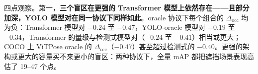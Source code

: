 \documentclass[10pt,conference]{IEEEtran}
\begin{document}
\begin{table}[t]
\centering
\caption{oracle 协议下的 M3 时序指标（PoseTrack18 val；保留轨迹段：ViTPose-B/L 为 868 / 885，round5-3-oracle / YOLO11s-oracle 为 709 / 651，覆盖 170 个视频）。匹配口径 AP：0.5248 / 0.5548（ViTPose-B/L），0.3301 / 0.3085（round5-3-oracle / YOLO11s-oracle；oracle 值，与表~\ref{tab:m3} 的检测式值不可比）。AP 代价 $=$ 平滑后匹配口径 AP $-$ 原始。YOLO-oracle 的平滑总结在正文（第~5.5 节）。$^{\dagger}$ 检测式运行（表~\ref{tab:m3}）；仅作桥梁。}
\label{tab:m3x}
\renewcommand{\arraystretch}{1.15}
\end{table}

四点观察。第一，\textbf{三个盲区在更强的 Transformer 模型上依然存在——且部分加深，YOLO 模型对在同一协议下同样如此}。oracle 协议下每个组合的 $\Delta_{\mathrm{occ}}$ 均为负：Transformer 模型对 $-0.24$ 至 $-0.47$，YOLO-oracle 模型对 $-0.19$ 至 $-0.34$，Transformer 的量级与检测式模型对（$-0.24$ 至 $-0.41$）相当或更大；COCO 上 ViTPose oracle 的 $\Delta_{\mathrm{occ}}$（$-0.47$）甚至超过检测式的 $-0.40$。更强的架构或更大的容量买不来更小的盲区：两种协议下，全量 mAP 都把遮挡场景表现高估了 19--47 个点。
\end{document}

